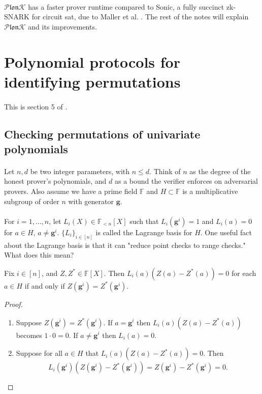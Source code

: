 \documentclass[11pt]{article}
\newcommand{\plonk}{$\mathcal{P} \mathfrak{lon} \mathcal{K}$}
\newcommand{\gen}{\mathbf{g}}
\begin{document}
\paragraph{} \plonk{} has a faster prover runtime compared to Sonic, a fully succinct zk-SNARK for circuit sat, due to Maller et al. \cite{sonic}. The rest of the notes will explain \plonk{} and its improvements.

\section{Polynomial protocols for identifying permutations}
\paragraph{} This is section 5 of \cite{plonk}.

\subsection{Checking permutations of univariate polynomials}

\paragraph{} Let $n, d$ be two integer parameters, with $n \leq d$. Think of $n$ as the degree of the honest prover's polynomials, and $d$ as a bound the verifier enforces on adversarial provers. Also assume we have a prime field $\mathbb{F}$ and $H \subset \mathbb{F}$ is a multiplicative subgroup of order $n$ with generator $\gen{}$.

\paragraph{} For $i = 1, \ldots, n$, let $L_i(X) \in \mathbb{F}_{<n}[X]$ such that $L_i(\gen{}^i) = 1$ and $L_i(a) = 0$ for $a \in H$, $a \neq \gen{}^i$. $\{ L_i \}_{i \in [n]}$ is called the Lagrange basis for $H$. One useful fact about the Lagrange basis is that it can "reduce point checks to range checks." What does this mean?

\begin{fact}
    Fix $i \in [n]$, and $Z, Z^* \in \mathbb{F}[X]$. Then $L_i(a)(Z(a) - Z^*(a)) = 0$ for each $a \in H$ if and only if $Z(\gen^i) = Z^*(\gen^i)$.
\end{fact}
\begin{proof}
    \begin{enumerate}
        \item Suppose $Z(\gen^i) = Z^*(\gen^i)$. If $a = \gen^i$ then $L_i(a)(Z(a) - Z^*(a))$ becomes $1 \cdot 0 = 0$. If $a \neq \gen^i$ then $L_i(a) = 0$.
        \item Suppose for all $a \in H$ that $L_i(a) (Z(a) - Z^*(a)) = 0$. Then 
        \[L_i(\gen^i) (Z(\gen^i) - Z^*(\gen^i)) = Z(\gen^i) - Z^*(\gen^i) = 0.\]
    \end{enumerate}
\end{proof}
\end{document}
